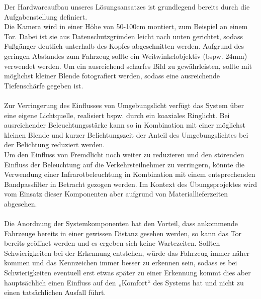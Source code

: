 \documentclass{../Vorlage/sebDenCls}
\begin{document}
Der Hardwareaufbau unseres Lösungsansatzes ist grundlegend bereits durch die Aufgabenstellung definiert.\\
Die Kamera wird in einer Höhe von 50-100cm montiert, zum Beispiel an einem Tor. Dabei ist sie aus Datenschutzgründen leicht nach unten gerichtet, sodass Fußgänger deutlich unterhalb des Kopfes abgeschnitten werden. Aufgrund des geringen Abstandes zum Fahrzeug sollte ein Weitwinkelobjektiv (bspw. 24mm) verwendet werden. Um ein ausreichend scharfes Bild zu gewährleisten, sollte mit möglichst kleiner Blende fotografiert werden, sodass eine ausreichende Tiefenschärfe gegeben ist. \\
\\
Zur Verringerung des Einflusses von Umgebungslicht verfügt das System über eine eigene Lichtquelle, realisiert bspw. durch ein koaxiales Ringlicht. Bei ausreichender Beleuchtungsstärke kann so in Kombination mit einer möglichst kleinen Blende und kurzer Belichtungszeit der Anteil des Umgebungslichtes bei der Belichtung reduziert werden.\\
Um den Einfluss von Fremdlicht noch weiter zu reduzieren und den störenden Einfluss der Beleuchtung auf die Verkehrsteilnehmer zu verringern, könnte die Verwendung einer Infrarotbeleuchtung in Kombination mit einem entsprechenden Bandpassfilter in Betracht gezogen werden. Im Kontext des Übungsprojektes wird vom Einsatz dieser Komponenten aber aufgrund von Materiallieferzeiten abgesehen.\\
\\
Die Anordnung der Systemkomponenten hat den Vorteil, dass ankommende Fahrzeuge bereits in einer gewissen Distanz gesehen werden, so kann das Tor bereits geöffnet werden und es ergeben sich keine Wartezeiten. Sollten Schwierigkeiten bei der Erkennung entstehen, würde das Fahrzeug immer näher kommen und das Kennzeichen immer besser zu erkennen sein, sodass es bei Schwierigkeiten eventuell erst etwas später zu einer Erkennung kommt dies aber hauptsächlich einen Einfluss auf den „Komfort“ des Systems hat und nicht zu einen tatsächlichen Ausfall führt.
\end{document}
